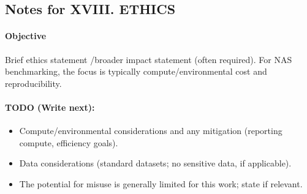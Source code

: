 \subsection*{Notes for XVIII. ETHICS}
\paragraph{Objective}
Brief ethics statement /broader impact statement (often required). For NAS benchmarking, the focus is typically compute/environmental cost and reproducibility.

\paragraph{TODO (Write next):}
\begin{itemize}
  \item Compute/environmental considerations and any mitigation (reporting compute, efficiency goals).
  \item Data considerations (standard datasets; no sensitive data, if applicable).
  \item The potential for misuse is generally limited for this work; state if relevant.
\end{itemize}
